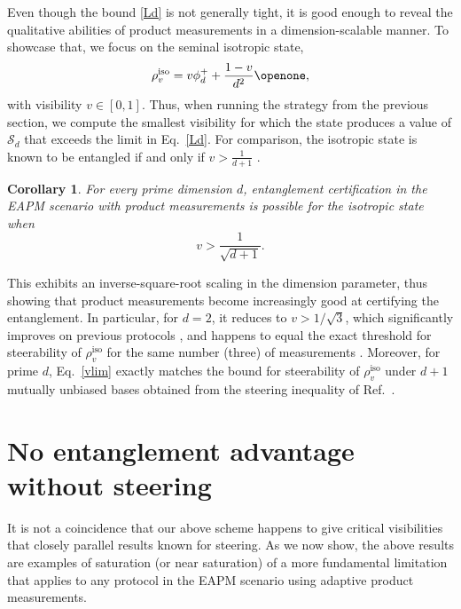 \documentclass[aps,superscriptaddress,twocolumn,twoside,floatfix,pra,nofootinbib,a4paper]{revtex4-2}
\newcommand{\moha}[1]{\textit{\small\textcolor{cyan}{moha: #1}}}
\newtheorem{corollary}{Corollary}
\begin{document}
Even though the bound \eqref{Ld} is not generally tight, it is good enough to reveal the qualitative abilities of product measurements in a dimension-scalable manner. To showcase that, we focus on the seminal isotropic state,
\begin{equation}
\rho_v^\text{iso}=v\phi^+_d+\frac{1-v}{d^2}\openone,
\end{equation}
with visibility $v\in[0,1]$. Thus, when running the strategy from the previous section, we compute the smallest visibility for which the state produces a value of $\mathcal{S}_d$ that exceeds the limit in Eq.~\eqref{Ld}. For comparison, the isotropic state is known to be entangled if and only if $v>\frac{1}{d+1}$ \cite{Horodecki1996}. 


\begin{corollary}\label{prop1}
For every prime dimension $d$,  entanglement certification in the EAPM scenario with product measurements is possible for the isotropic state when
\begin{equation}\label{vlim}
v>\frac{1}{\sqrt{d+1}}.
\end{equation}
\end{corollary}
This exhibits an inverse-square-root scaling in the dimension parameter, thus showing that product measurements become increasingly good at certifying the entanglement. In particular, for $d=2$, it reduces to $v>1/\sqrt{3}$, which significantly improves on previous protocols \cite{Piveteau2022}, and happens to equal the exact threshold for steerability of $\rho_v^\text{iso}$ for the same number (three) of measurements \cite{Bavaresco2017}. Moreover, for prime $d$, Eq.~\eqref{vlim} exactly matches the bound for steerability of $\rho_v^\text{iso}$ under $d+1$ mutually unbiased bases obtained from the steering inequality of Ref.~\cite{Marciniak2015}. 





\section{No entanglement advantage without steering}\label{sec2}
It is not a coincidence that our above scheme happens to give critical visibilities that closely parallel results known for steering. As we now show, the above results are examples of saturation (or near saturation) of a more fundamental limitation that applies to any protocol in the EAPM scenario using adaptive product measurements. 
\end{document}
